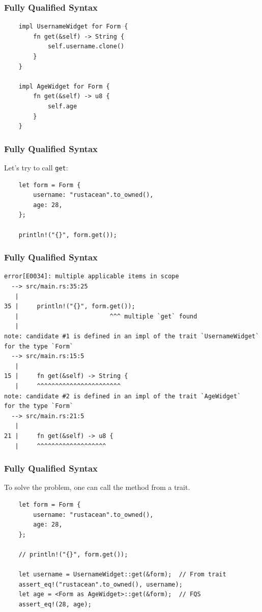 \documentclass[aspectratio=1610,t]{beamer}
\begin{document}

\begin{frame}[fragile]
\frametitle{Fully Qualified Syntax}
\begin{verbatim}
    impl UsernameWidget for Form {
        fn get(&self) -> String {
            self.username.clone()
        }
    }

    impl AgeWidget for Form {
        fn get(&self) -> u8 {
            self.age
        }
    }
\end{verbatim}
\end{frame}


\begin{frame}[fragile]
\frametitle{Fully Qualified Syntax}
Let's try to call \texttt{get}:

\begin{verbatim}
    let form = Form {
        username: "rustacean".to_owned(),
        age: 28,
    };

    println!("{}", form.get());
\end{verbatim}
\end{frame}


\begin{frame}[fragile]
\frametitle{Fully Qualified Syntax}
\begin{verbatim}
error[E0034]: multiple applicable items in scope
  --> src/main.rs:35:25
   |
35 |     println!("{}", form.get());
   |                         ^^^ multiple `get` found
   |
note: candidate #1 is defined in an impl of the trait `UsernameWidget`
for the type `Form`
  --> src/main.rs:15:5
   |
15 |     fn get(&self) -> String {
   |     ^^^^^^^^^^^^^^^^^^^^^^^
note: candidate #2 is defined in an impl of the trait `AgeWidget`
for the type `Form`
  --> src/main.rs:21:5
   |
21 |     fn get(&self) -> u8 {
   |     ^^^^^^^^^^^^^^^^^^^
\end{verbatim}
\end{frame}


\begin{frame}[fragile]
\frametitle{Fully Qualified Syntax}
To solve the problem, one can call the method from a trait.

\begin{verbatim}
    let form = Form {
        username: "rustacean".to_owned(),
        age: 28,
    };

    // println!("{}", form.get());

    let username = UsernameWidget::get(&form);  // From trait
    assert_eq!("rustacean".to_owned(), username);
    let age = <Form as AgeWidget>::get(&form);  // FQS
    assert_eq!(28, age);
\end{verbatim}
\end{frame}
\end{document}
